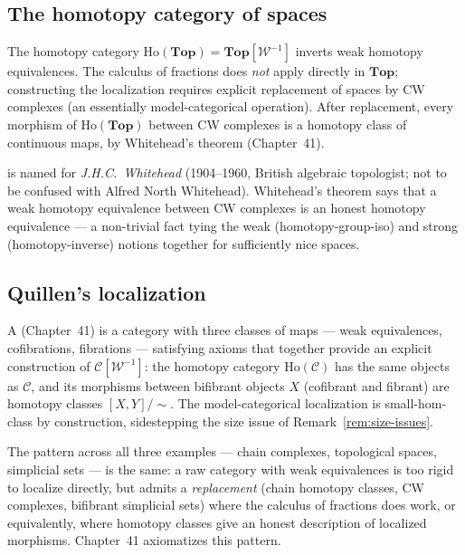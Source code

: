 \subsection{The homotopy category of spaces}

\begin{example_thm}
\label{ex:ho-top}
The homotopy category $\mathrm{Ho}(\mathbf{Top}) = \mathbf{Top}[\mathcal{W}^{-1}]$
inverts weak homotopy equivalences. The calculus of fractions does
\emph{not} apply directly in $\mathbf{Top}$; constructing the
localization requires explicit replacement of spaces by CW complexes
(an essentially model-categorical operation). After replacement, every
morphism of $\mathrm{Ho}(\mathbf{Top})$ between CW complexes is a
homotopy class of continuous maps, by Whitehead's theorem (Chapter~41).
\end{example_thm}

\begin{nameorigin}
 is named for \emph{J.H.C.\ Whitehead}
(1904--1960, British algebraic topologist; not to be confused with
Alfred North Whitehead). Whitehead's theorem says that a weak homotopy
equivalence between CW complexes is an honest homotopy equivalence —
a non-trivial fact tying the weak (homotopy-group-iso) and strong
(homotopy-inverse) notions together for sufficiently nice spaces.
\end{nameorigin}

\subsection{Quillen's localization}

\begin{remark}
A  (Chapter~41) is a category with three classes
of maps — weak equivalences, cofibrations, fibrations — satisfying
axioms that together provide an explicit construction of
$\mathcal{C}[\mathcal{W}^{-1}]$: the homotopy category
$\mathrm{Ho}(\mathcal{C})$ has the same objects as $\mathcal{C}$, and
its morphisms between bifibrant objects $X$ (cofibrant and fibrant) are
homotopy classes $[X, Y]/\sim$. The model-categorical localization is
small-hom-class by construction, sidestepping the size issue of
Remark~\ref{rem:size-issues}.
\end{remark}

\begin{readernote}
The pattern across all three examples — chain complexes, topological
spaces, simplicial sets — is the same: a raw category with weak
equivalences is too rigid to localize directly, but admits a
\emph{replacement} (chain homotopy classes, CW complexes, bifibrant
simplicial sets) where the calculus of fractions does work, or
equivalently, where homotopy classes give an honest description of
localized morphisms. Chapter~41 axiomatizes this pattern.
\end{readernote}


